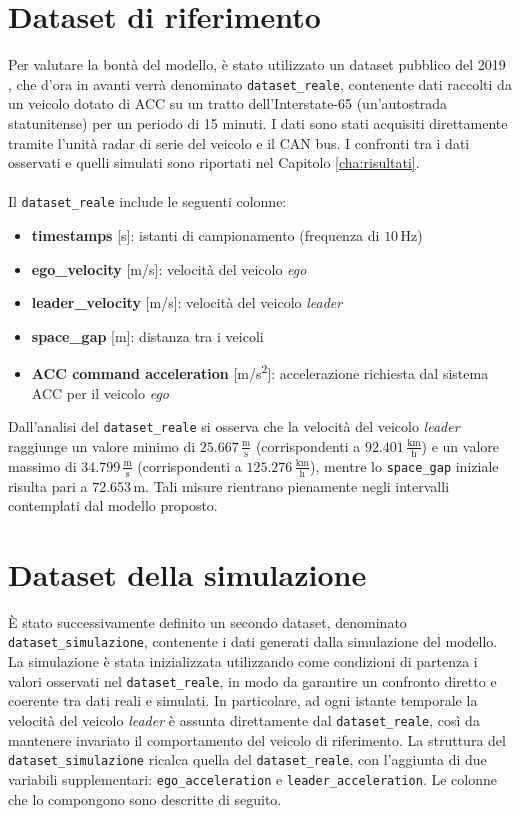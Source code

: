 \section{Dataset di riferimento}
Per valutare la bontà del modello, è stato utilizzato un dataset pubblico del 2019 \cite{wang2019acc_dataset}, che d'ora in avanti
verrà denominato \texttt{dataset\_reale}, contenente dati raccolti da un veicolo dotato di ACC su un tratto dell'Interstate-65 
(un'autostrada statunitense) per un periodo di 15 minuti.  
I dati sono stati acquisiti direttamente tramite l'unità radar di serie del veicolo e il CAN bus.  
I confronti tra i dati osservati e quelli simulati sono riportati nel Capitolo \ref{cha:risultati}.
\\\\
\noindent Il \texttt{dataset\_reale} include le seguenti colonne:
\begin{itemize}
    \item \textbf{timestamps} [s]: istanti di campionamento (frequenza di $10\,\mathrm{Hz}$)
    \item \textbf{ego\_velocity} [m/s]: velocità del veicolo \emph{ego}
    \item \textbf{leader\_velocity} [m/s]: velocità del veicolo \emph{leader}
    \item \textbf{space\_gap} [m]: distanza tra i veicoli
    \item \textbf{ACC command acceleration} [m/s\textsuperscript{2}]: accelerazione richiesta dal sistema ACC per il veicolo \emph{ego}
\end{itemize}

\noindent Dall'analisi del \texttt{dataset\_reale} si osserva che la velocità del veicolo \emph{leader} 
raggiunge un valore minimo di $25.667 \, \frac{\mathrm{m}}{\mathrm{s}}$ 
(corrispondenti a $92.401 \, \frac{\mathrm{km}}{\mathrm{h}}$) e un valore massimo di 
$34.799 \, \frac{\mathrm{m}}{\mathrm{s}}$ (corrispondenti a $125.276 \, \frac{\mathrm{km}}{\mathrm{h}}$), 
mentre lo \texttt{space\_gap} iniziale risulta pari a $72.653 \, \mathrm{m}$.  
Tali misure rientrano pienamente negli intervalli contemplati dal modello proposto.

\section{Dataset della simulazione}
\noindent È stato successivamente definito un secondo dataset, denominato \texttt{dataset\_simulazione}, 
contenente i dati generati dalla simulazione del modello.  
La simulazione è stata inizializzata utilizzando come condizioni di partenza i valori osservati nel \texttt{dataset\_reale}, 
in modo da garantire un confronto diretto e coerente tra dati reali e simulati.  
In particolare, ad ogni istante temporale la velocità del veicolo \emph{leader} è assunta direttamente dal \texttt{dataset\_reale}, 
così da mantenere invariato il comportamento del veicolo di riferimento.  
La struttura del \texttt{dataset\_simulazione} ricalca quella del \texttt{dataset\_reale}, 
con l'aggiunta di due variabili supplementari: \texttt{ego\_acceleration} e \texttt{leader\_acceleration}.  
Le colonne che lo compongono sono descritte di seguito.

